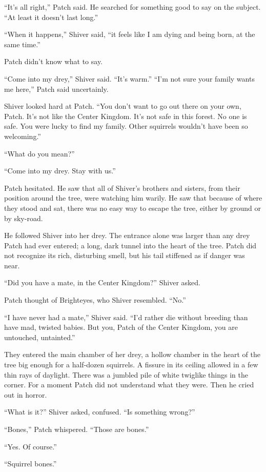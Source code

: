 \documentclass[ebook,oneside,openany,12pt]{memoir}
\begin{document}
“It’s all right,” Patch said. He searched for something good to say on
the subject. “At least it doesn’t last long.”

“When it happens,” Shiver said, “it feels like I am dying and being
born, at the same time.”

Patch didn’t know what to say.

“Come into my drey,” Shiver said. “It’s warm.” “I’m not sure your
family wants me here,” Patch said uncertainly.

Shiver looked hard at Patch. “You don’t want to go out there on your
own, Patch. It’s not like the Center Kingdom. It’s not safe in this
forest. No one is safe. You were lucky to find my family. Other
squirrels wouldn’t have been so welcoming.”

“What do you mean?”

“Come into my drey. Stay with us.”

Patch hesitated. He saw that all of Shiver’s brothers and sisters,
from their position around the tree, were watching him warily. He saw
that because of where they stood and sat, there was no easy way to
escape the tree, either by ground or by sky-road.

He followed Shiver into her drey. The entrance alone was larger than
any drey Patch had ever entered; a long, dark tunnel into the heart of
the tree. Patch did not recognize its rich, disturbing smell, but his
tail stiffened as if danger was near.

“Did you have a mate, in the Center Kingdom?” Shiver asked.

Patch thought of Brighteyes, who Shiver resembled. “No.”

“I have never had a mate,” Shiver said. “I’d rather die without
breeding than have mad, twisted babies. But you, Patch of the Center
Kingdom, you are untouched, untainted.”

They entered the main chamber of her drey, a hollow chamber in the
heart of the tree big enough for a half-dozen squirrels. A fissure in
its ceiling allowed in a few thin rays of daylight. There was a
jumbled pile of white twiglike things in the corner. For a moment
Patch did not understand what they were. Then he cried out in horror.

“What is it?” Shiver asked, confused. “Is something wrong?”

“Bones,” Patch whispered. “Those are bones.”

“Yes. Of course.”

“Squirrel bones.”
\end{document}
